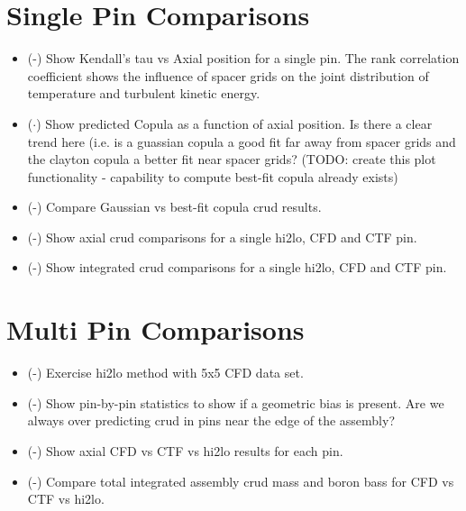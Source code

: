 
\section{Single Pin Comparisons}

\begin{itemize}
	\item (\checkmark-) Show Kendall's tau vs Axial position for a single pin.  The rank correlation coefficient shows
	the influence of spacer grids on the joint distribution of temperature and turbulent kinetic energy.
	\item ($\cdot$) Show predicted Copula as a function of axial position.  Is there a clear trend here (i.e. is a guassian copula
	a good fit far away from spacer grids and the clayton copula a better fit near spacer grids?  (TODO: create this plot functionality - capability to compute best-fit copula already exists)
	\item (\checkmark-) Compare Gaussian vs best-fit copula crud results.
	\item (\checkmark-) Show axial crud comparisons for a single hi2lo, CFD and CTF pin.
	\item (\checkmark-) Show integrated crud comparisons for a single hi2lo, CFD and CTF pin.
\end{itemize}

\section{Multi Pin Comparisons}

\begin{itemize}
	\item (\checkmark-) Exercise hi2lo method with 5x5 CFD data set.
	\item (\checkmark-) Show pin-by-pin statistics to show if a geometric bias is present.  Are we always over predicting crud
	in pins near the edge of the assembly?
	\item (\checkmark-) Show axial CFD vs CTF vs hi2lo results for each pin.
	\item (\checkmark-) Compare total integrated assembly crud mass and boron bass for CFD vs CTF vs hi2lo.
\end{itemize}
